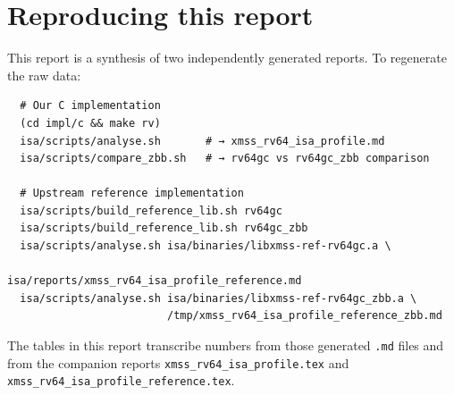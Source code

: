 \documentclass[11pt,a4paper]{article}
\begin{document}
\section{Reproducing this report}

This report is a synthesis of two independently generated reports.
To regenerate the raw data:

\begin{verbatim}
  # Our C implementation
  (cd impl/c && make rv)
  isa/scripts/analyse.sh       # → xmss_rv64_isa_profile.md
  isa/scripts/compare_zbb.sh   # → rv64gc vs rv64gc_zbb comparison

  # Upstream reference implementation
  isa/scripts/build_reference_lib.sh rv64gc
  isa/scripts/build_reference_lib.sh rv64gc_zbb
  isa/scripts/analyse.sh isa/binaries/libxmss-ref-rv64gc.a \
                         isa/reports/xmss_rv64_isa_profile_reference.md
  isa/scripts/analyse.sh isa/binaries/libxmss-ref-rv64gc_zbb.a \
                         /tmp/xmss_rv64_isa_profile_reference_zbb.md
\end{verbatim}

The tables in this report transcribe numbers from those generated
\texttt{.md} files and from the companion reports
\texttt{xmss\_rv64\_isa\_profile.tex} and
\texttt{xmss\_rv64\_isa\_profile\_reference.tex}.
\end{document}
